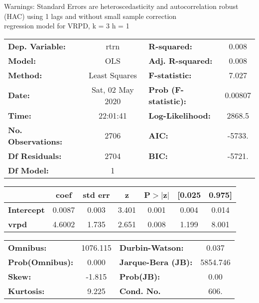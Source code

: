 Warnings: \newline
 [1] Standard Errors are heteroscedasticity and autocorrelation robust (HAC) using 1 lags and without small sample correction\\ 

regression model for VRPD, k = 3 h = 1\begin{center}
\begin{tabular}{lclc}
\toprule
\textbf{Dep. Variable:}    &       rtrn       & \textbf{  R-squared:         } &     0.008   \\
\textbf{Model:}            &       OLS        & \textbf{  Adj. R-squared:    } &     0.008   \\
\textbf{Method:}           &  Least Squares   & \textbf{  F-statistic:       } &     7.027   \\
\textbf{Date:}             & Sat, 02 May 2020 & \textbf{  Prob (F-statistic):} &  0.00807    \\
\textbf{Time:}             &     22:01:41     & \textbf{  Log-Likelihood:    } &    2868.5   \\
\textbf{No. Observations:} &        2706      & \textbf{  AIC:               } &    -5733.   \\
\textbf{Df Residuals:}     &        2704      & \textbf{  BIC:               } &    -5721.   \\
\textbf{Df Model:}         &           1      & \textbf{                     } &             \\
\bottomrule
\end{tabular}
\begin{tabular}{lcccccc}
                   & \textbf{coef} & \textbf{std err} & \textbf{z} & \textbf{P$> |$z$|$} & \textbf{[0.025} & \textbf{0.975]}  \\
\midrule
\textbf{Intercept} &       0.0087  &        0.003     &     3.401  &         0.001        &        0.004    &        0.014     \\
\textbf{vrpd}      &       4.6002  &        1.735     &     2.651  &         0.008        &        1.199    &        8.001     \\
\bottomrule
\end{tabular}
\begin{tabular}{lclc}
\textbf{Omnibus:}       & 1076.115 & \textbf{  Durbin-Watson:     } &    0.037  \\
\textbf{Prob(Omnibus):} &   0.000  & \textbf{  Jarque-Bera (JB):  } & 5854.746  \\
\textbf{Skew:}          &  -1.815  & \textbf{  Prob(JB):          } &     0.00  \\
\textbf{Kurtosis:}      &   9.225  & \textbf{  Cond. No.          } &     606.  \\
\bottomrule
\end{tabular}
\end{center}

